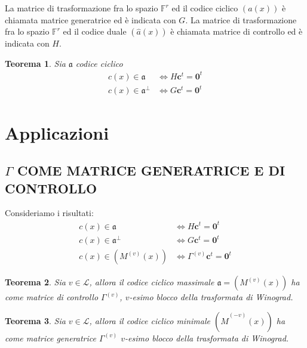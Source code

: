 \documentclass[mathserif]{beamer}
\newtheorem{teorema}{Teorema}
\begin{document}
\begin{frame}
  La matrice di trasformazione fra lo spazio $\mathbb{F}^{r}$ ed il codice ciclico $(a(x))$ è chiamata matrice generatrice ed è indicata con $G$. 
  La matrice di trasformazione fra lo spazio $\mathbb{F}^{r}$ ed il codice duale $(\hat{a}(x))$ è chiamata matrice di controllo ed è indicata con $H$.
  \begin{teorema}
     Sia $\mathfrak{a} $ codice ciclico 
     \begin{align*}
	c(x) \in \mathfrak{a} &\iff H \mathbf{c}^{t} = \mathbf{0}^{t}  \\
	c(x) \in \mathfrak{a}^{\perp} &\iff G \mathbf{c}^{t} = \mathbf{0}^{t} 
      \end{align*}
  \end{teorema}
\end{frame}





\section{Applicazioni}
\subsection{$\Gamma$ COME MATRICE GENERATRICE E DI CONTROLLO}
\begin{frame}
  Consideriamo i risultati:
      \begin{align*}
      c(x) \in \mathfrak{a} &\iff H \mathbf{c}^{t} = \mathbf{0}^{t}  \\
      c(x) \in \mathfrak{a}^{\perp} &\iff G \mathbf{c}^{t} = \mathbf{0}^{t} \\
      c(x) \in (M^{(v)}(x)) &\iff \Gamma^{(v)} \mathbf{c}^{t} = \mathbf{0}^{t}
    \end{align*}
   \begin{teorema}
      Sia $v \in \mathscr{L}$, allora il codice ciclico massimale $\mathfrak{a} = (M^{(v)}(x))$ ha come matrice di controllo $\Gamma^{(v)} $, $v$-esimo blocco della trasformata di Winograd. 
    \end{teorema}
    \begin{teorema}
      Sia $v \in \mathscr{L}$, allora il codice ciclico minimale $(\hat{M}^{(-v)}(x))$ ha come matrice generatrice $\Gamma^{(v)} $ $v$-esimo blocco della trasformata di Winograd.
    \end{teorema}
\end{frame}
\end{document}
